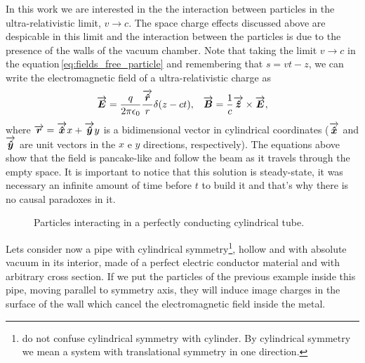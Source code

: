 \begin{apendicesenv}
    In this work we are interested in the the interaction between particles in the ultra-relativistic limit, $v \to c$. The space charge effects discussed above are despicable in this limit and the interaction between the particles is due to the presence of the walls of the vacuum chamber. Note that taking the limit $v \to c$ in the equation\,\ref{eq:fields_free_particle} and remembering that $s = vt - z$, we can write the electromagnetic field of a ultra-relativistic charge as
    \begin{align}
    	\overrightarrow{\boldsymbol{E}} =
		\frac{q}{2\pi\epsilon_0}\frac{\overrightarrow{\boldsymbol{\hat{r}}}}{r}\delta(z-ct), &
		& \overrightarrow{\boldsymbol{B}} =\frac{1}{c}\overrightarrow{\boldsymbol{\hat{z}}}\times\overrightarrow{\boldsymbol{E}},
    \end{align}
    where $\overrightarrow{\boldsymbol{r}} = \overrightarrow{\boldsymbol{\hat{x}}}x + \overrightarrow{\boldsymbol{\hat{y}}}y$ is a bidimensional vector in cylindrical coordinates ($\overrightarrow{\boldsymbol{\hat{x}}}$ and $\overrightarrow{\boldsymbol{\hat{y}}}$ are unit vectors in the $x$ e $y$ directions, respectively). The equations above show that the field is pancake-like and follow the beam as it travels through the empty space. It is important to notice that this solution is steady-state, it was necessary an infinite amount of time before $t$ to build it and that's why there is no causal paradoxes in it.

    \begin{figure}[hb!]
	    \centering
	    \caption{Particles interacting in a perfectly conducting cylindrical tube.}
        \label{fig:wake2}
    \end{figure}

    Lets consider now a pipe with cylindrical symmetry\footnote{do not confuse cylindrical symmetry with cylinder. By cylindrical symmetry we mean a system with translational symmetry in one direction.}, hollow and with absolute vacuum in its interior, made of a perfect electric conductor material and with arbitrary cross section. If we put the particles of the previous example inside this pipe, moving parallel to symmetry axis, they will induce image charges in the surface of the wall which cancel the electromagnetic field inside the metal.


\end{apendicesenv}
